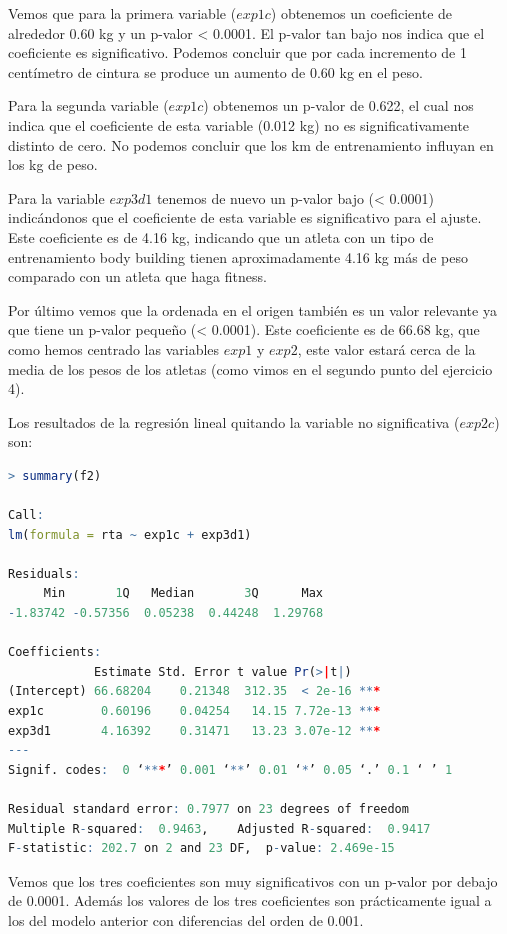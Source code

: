 \documentclass[a4paper]{article}
\begin{document}
Vemos que para la primera variable ($exp1c$) obtenemos un coeficiente de alrededor 0.60 kg y un p-valor < 0.0001. El p-valor tan bajo nos indica que el coeficiente es significativo. Podemos concluir que por cada incremento de 1 centímetro de cintura se produce un aumento de 0.60 kg en el peso.\par
Para la segunda variable ($exp1c$) obtenemos un p-valor de 0.622, el cual nos indica que el coeficiente de esta variable (0.012 kg) no es significativamente distinto de cero. No podemos concluir que los km de entrenamiento influyan en los kg de peso. \par
Para la variable $exp3d1$ tenemos de nuevo un p-valor bajo (< 0.0001) indicándonos que el coeficiente de esta variable es significativo para el ajuste. Este coeficiente es de 4.16 kg, indicando que un atleta con un tipo de entrenamiento body building tienen aproximadamente 4.16 kg más de peso comparado con un atleta que haga fitness.\par
Por último vemos que la ordenada en el origen también es un valor relevante ya que tiene un p-valor pequeño (< 0.0001). Este coeficiente es de 66.68 kg, que como hemos centrado las variables $exp1$ y $exp2$, este valor estará cerca de la media de los pesos de los atletas (como vimos en el segundo punto del ejercicio 4).\par
Los resultados de la regresión lineal quitando la variable no significativa ($exp2c$) son: \par
\begin{lstlisting}[language=R]
> summary(f2)

Call:
lm(formula = rta ~ exp1c + exp3d1)

Residuals:
     Min       1Q   Median       3Q      Max 
-1.83742 -0.57356  0.05238  0.44248  1.29768 

Coefficients:
            Estimate Std. Error t value Pr(>|t|)    
(Intercept) 66.68204    0.21348  312.35  < 2e-16 ***
exp1c        0.60196    0.04254   14.15 7.72e-13 ***
exp3d1       4.16392    0.31471   13.23 3.07e-12 ***
---
Signif. codes:  0 ‘***’ 0.001 ‘**’ 0.01 ‘*’ 0.05 ‘.’ 0.1 ‘ ’ 1

Residual standard error: 0.7977 on 23 degrees of freedom
Multiple R-squared:  0.9463,	Adjusted R-squared:  0.9417 
F-statistic: 202.7 on 2 and 23 DF,  p-value: 2.469e-15
\end{lstlisting}
Vemos que los tres coeficientes son muy significativos con un p-valor por debajo de 0.0001. Además los valores de los tres coeficientes son prácticamente igual a los del modelo anterior con diferencias del orden de 0.001.\par
\end{document}
